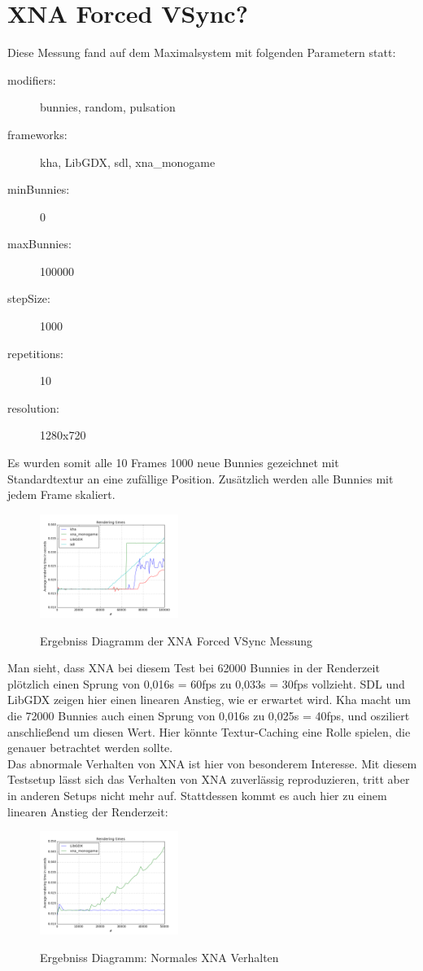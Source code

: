 \section{XNA Forced VSync?}
Diese Messung fand auf dem Maximalsystem mit folgenden Parametern statt:
\begin{description}
\item[modifiers:] bunnies, random, pulsation
\item[frameworks:] kha, LibGDX, sdl, xna_monogame
\item[minBunnies:] 0
\item[maxBunnies:] 100000
\item[stepSize:] 1000
\item[repetitions:] 10
\item[resolution:] 1280x720
\end{description}
Es wurden somit alle 10 Frames 1000 neue Bunnies gezeichnet mit Standardtextur an eine zufällige Position. Zusätzlich werden alle Bunnies mit jedem Frame skaliert.
\begin{figure}[h]
\caption{Ergebniss Diagramm der XNA Forced VSync Messung}
\centering
\includegraphics[width=0.4\textwidth]{xna_forced}
\label{dia:xna_forced}
\end{figure}
Man sieht, dass XNA bei diesem Test bei 62000 Bunnies in der Renderzeit plötzlich einen Sprung von 0,016s = 60fps zu 0,033s = 30fps vollzieht. SDL und LibGDX zeigen hier einen linearen Anstieg, wie er erwartet wird. Kha macht um die 72000 Bunnies auch einen Sprung von 0,016s zu 0,025s = 40fps, und osziliert anschließend um diesen Wert. Hier könnte Textur-Caching eine Rolle spielen, die genauer betrachtet werden sollte. \\
Das abnormale Verhalten von XNA ist hier von besonderem Interesse. Mit diesem Testsetup lässt sich das Verhalten von XNA zuverlässig reproduzieren, tritt aber in anderen Setups nicht mehr auf. Stattdessen kommt es auch hier zu einem linearen Anstieg der Renderzeit:

\begin{figure}[h]
\caption{Ergebniss Diagramm: Normales XNA Verhalten}
\centering
\includegraphics[width=0.4\textwidth]{xna_normal}
\label{dia:xna_normal}
\end{figure}

